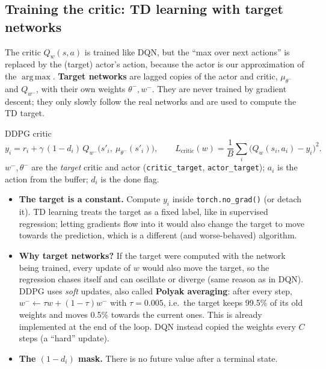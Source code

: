 \documentclass[11pt,a4paper]{article}
\DeclareMathOperator{\argmax}{arg\,max}
\newcommand{\code}[1]{\texttt{#1}}
\begin{document}
\subsection{Training the critic: TD learning with target networks}
The critic $Q_w(s,a)$ is trained like DQN, but the \enquote{max over next actions} is replaced by the (target) actor's action, because the actor is our approximation of the $\argmax$.
\textbf{Target networks} are lagged copies of the actor and critic, $\mu_{\theta^-}$ and $Q_{w^-}$, with their own weights $\theta^-,w^-$. They are never trained by gradient descent; they only slowly follow the real networks and are used to compute the TD target.
\begin{keybox}{DDPG critic}
\vspace{-0.6em}
\begin{equation}
  y_i = r_i + \gamma\,(1-d_i)\,Q_{w^-}\big(s'_i,\ \mu_{\theta^-}(s'_i)\big),
  \qquad
  L_{\mathrm{critic}}(w) = \frac1B\sum_i\big(Q_w(s_i,a_i)-y_i\big)^2 .
\end{equation}
$w^-,\theta^-$ are the \emph{target} critic and actor (\code{critic\_target}, \code{actor\_target}); $a_i$ is the action from the buffer; $d_i$ is the done flag.
\end{keybox}
\begin{itemize}[nosep]
  \item \textbf{The target is a constant.} Compute $y_i$ inside \code{torch.no\_grad()} (or detach it). TD learning treats the target as a fixed label, like in supervised regression; letting gradients flow into it would also change the target to move towards the prediction, which is a different (and worse-behaved) algorithm.
  \item \textbf{Why target networks?} If the target were computed with the network being trained, every update of $w$ would also move the target, so the regression chases itself and can oscillate or diverge (same reason as in DQN). DDPG uses \emph{soft} updates, also called \textbf{Polyak averaging}: after every step, $w^-\gets\tau w+(1-\tau)w^-$ with $\tau=0.005$, i.e.\ the target keeps 99.5\% of its old weights and moves 0.5\% towards the current ones. This is already implemented at the end of the loop. DQN instead copied the weights every $C$ steps (a \enquote{hard} update).
  \item \textbf{The $(1-d_i)$ mask.} There is no future value after a terminal state.
\end{itemize}
\end{document}
